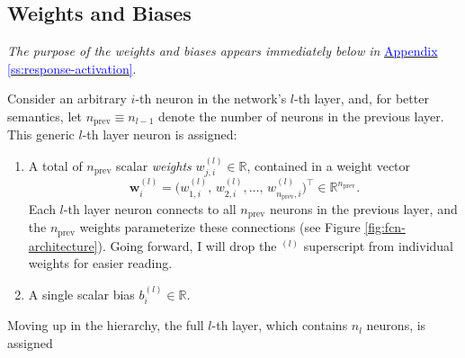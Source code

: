 \documentclass[11pt, a4paper]{article}
\newcommand{\myhref}[2]{\hyperref[#1]{\textcolor{blue}{#2}}}
\renewcommand{\vec}[1]{\bm{#1}}
\newcommand{\w}{\vec{w}}
\begin{document}
\subsection{Weights and Biases}
\small{\textit{The purpose of the weights and biases appears immediately below in} \myhref{ss:response-activation}{Appendix \ref{ss:response-activation}}.}

\vspace{2mm}
Consider an arbitrary $ i $-th neuron in the network's $ l $-th layer, and, for better semantics, let $ n_{\text{prev}} \equiv n_{l - 1} $ denote the number of neurons in the previous layer.
This generic $ l $-th layer neuron is assigned:
\begin{enumerate}

    \item A total of $ n_{\text{prev}} $ scalar \textit{weights} $ w_{j,i}^{(l)} \in \mathbb{R} $, contained in a weight vector
    \begin{equation}
        \w_{i}^{(l)} = \Big(w_{1, i}^{(l)}, \, w_{2, i}^{(l)}, \ldots, \, w_{n_{\text{prev}}, i}^{(l)}\Big)^{\top} \in \mathbb{R}^{n_{\text{prev}}}. \label{eq:weight-vector}
    \end{equation}
    Each $ l $-th layer neuron connects to all $ n_{\text{prev}} $ neurons in the previous layer, and the $ n_{\text{prev}} $ weights parameterize these connections (see Figure \ref{fig:fcn-architecture}).
    Going forward, I will drop the $ {}^{(l)} $ superscript from individual weights for easier reading.


    \item A single scalar bias $ b^{(l)}_{i} \in \mathbb{R} $.

\end{enumerate}
Moving up in the hierarchy, the full $ l $-th layer, which contains $ n_{l} $ neurons, is assigned
\end{document}
